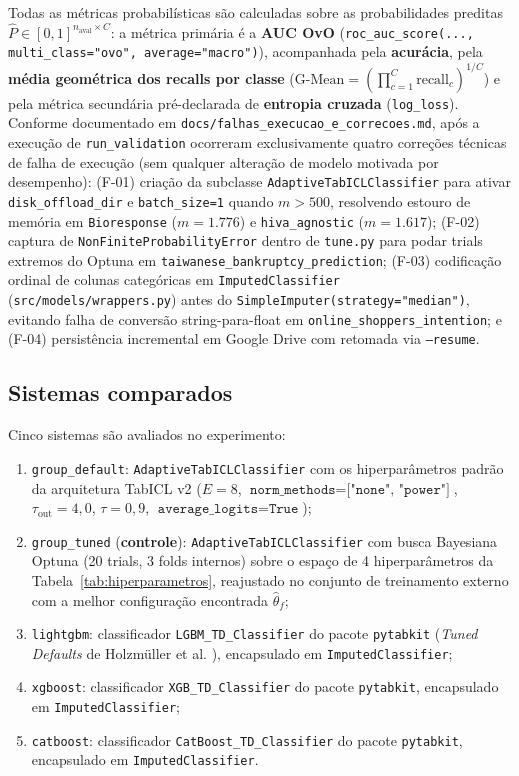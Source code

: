 \documentclass[11pt,a4paper]{article}
\begin{document}
Todas as métricas probabilísticas são calculadas sobre as probabilidades preditas $\hat{P} \in [0, 1]^{n_{\mathrm{aval}} \times C}$: a métrica primária é a \textbf{AUC OvO} (\texttt{roc\_auc\_score(..., multi\_class="ovo", average="macro")}), acompanhada pela \textbf{acurácia}, pela \textbf{média geométrica dos recalls por classe} ($\text{G-Mean} = (\prod_{c=1}^C \text{recall}_c)^{1/C}$) e pela métrica secundária pré-declarada de \textbf{entropia cruzada} (\texttt{log\_loss}). Conforme documentado em \texttt{docs/falhas\_execucao\_e\_correcoes.md}, após a execução de \texttt{run\_validation} ocorreram exclusivamente quatro correções técnicas de falha de execução (sem qualquer alteração de modelo motivada por desempenho): (F-01) criação da subclasse \texttt{AdaptiveTabICLClassifier} para ativar \texttt{disk\_offload\_dir} e \texttt{batch\_size=1} quando $m > 500$, resolvendo estouro de memória em \texttt{Bioresponse} ($m = 1.776$) e \texttt{hiva\_agnostic} ($m = 1.617$); (F-02) captura de \texttt{NonFiniteProbabilityError} dentro de \texttt{tune.py} para podar trials extremos do Optuna em \texttt{taiwanese\_bankruptcy\_prediction}; (F-03) codificação ordinal de colunas categóricas em \texttt{ImputedClassifier} (\texttt{src/models/wrappers.py}) antes do \texttt{SimpleImputer(strategy="median")}, evitando falha de conversão string-para-float em \texttt{online\_shoppers\_intention}; e (F-04) persistência incremental em Google Drive com retomada via \texttt{--resume}.

\subsection{Sistemas comparados}
\label{sec:sistemas}

Cinco sistemas são avaliados no experimento:
\begin{enumerate}[leftmargin=2em]
    \item \texttt{group\_default}: \texttt{AdaptiveTabICLClassifier} com os hiperparâmetros padrão da arquitetura TabICL v2 ($E = 8$, $\texttt{norm\_methods}=\texttt{["none", "power"]}$, $\tau_{\mathrm{out}} = 4{,}0$, $\tau = 0{,}9$, $\texttt{average\_logits}=\texttt{True}$);
    \item \texttt{group\_tuned} (\textbf{controle}): \texttt{AdaptiveTabICLClassifier} com busca Bayesiana Optuna (20 trials, 3 folds internos) sobre o espaço de 4 hiperparâmetros da Tabela~\ref{tab:hiperparametros}, reajustado no conjunto de treinamento externo com a melhor configuração encontrada $\hat{\theta}_f$;
    \item \texttt{lightgbm}: classificador \texttt{LGBM\_TD\_Classifier} do pacote \texttt{pytabkit} (\emph{Tuned Defaults} de Holzmüller et al. \cite{holzmuller2024better}), encapsulado em \texttt{ImputedClassifier};
    \item \texttt{xgboost}: classificador \texttt{XGB\_TD\_Classifier} do pacote \texttt{pytabkit}, encapsulado em \texttt{ImputedClassifier};
    \item \texttt{catboost}: classificador \texttt{CatBoost\_TD\_Classifier} do pacote \texttt{pytabkit}, encapsulado em \texttt{ImputedClassifier}.
\end{enumerate}
\end{document}
